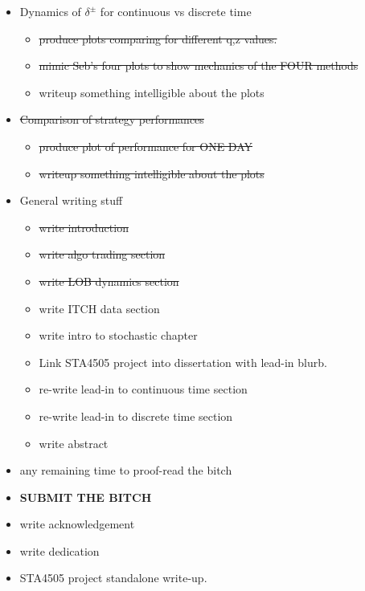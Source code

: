 \documentclass[12pt]{article}
\begin{document}
\begin{itemize}[topsep=0pt,itemsep=0ex,partopsep=0ex,parsep=0ex]
\item Dynamics of $\delta^\pm$ for continuous vs discrete time
\begin{itemize}[topsep=0pt,itemsep=0ex,partopsep=0ex,parsep=0ex]
\item \st{produce plots comparing for different q,z values.}
\item \st{mimic Seb's four plots to show mechanics of the FOUR methods}
\item writeup something intelligible about the plots

\end{itemize}

\item \st{Comparison of strategy performances}
\begin{itemize}[topsep=0pt,itemsep=0ex,partopsep=0ex,parsep=0ex]
\item \st{produce plot of performance for ONE DAY}
\item \st{writeup something intelligible about the plots}
\end{itemize}

\item General writing stuff
\begin{itemize}[topsep=0pt,itemsep=0ex,partopsep=0ex,parsep=0ex]
\item \st{write introduction}
\item \st{write algo trading section}
\item \st{write LOB dynamics section}
\item write ITCH data section
\item write intro to stochastic chapter
\item Link STA4505 project into dissertation with lead-in blurb.
\item re-write lead-in to continuous time section
\item re-write lead-in to discrete time section
\item write abstract
\end{itemize}

\item any remaining time to proof-read the bitch
\item {\bf SUBMIT THE BITCH}
\item write acknowledgement
\item write dedication
\item STA4505 project standalone write-up.
\end{itemize}
\end{document}
